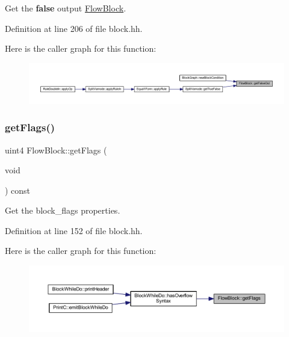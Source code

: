 Get the {\bfseries{false}} output \mbox{\hyperlink{class_flow_block}{Flow\+Block}}. 



Definition at line 206 of file block.\+hh.

Here is the caller graph for this function\+:
\nopagebreak
\begin{figure}[H]
\begin{center}
\leavevmode
\includegraphics[width=350pt]{class_flow_block_aadc5b837e1a1a2acc37f1f9cbcf04497_icgraph}
\end{center}
\end{figure}
\mbox{\label{class_flow_block_accae5b9d68d2a541494dd736765ff812}} 
\subsubsection{\texorpdfstring{getFlags()}{getFlags()}}
{\footnotesize\ttfamily uint4 Flow\+Block\+::get\+Flags (\begin{DoxyParamCaption}\item[{void}]{ }\end{DoxyParamCaption}) const\hspace{0.3cm}{\ttfamily [inline]}}



Get the block\+\_\+flags properties. 



Definition at line 152 of file block.\+hh.

Here is the caller graph for this function\+:
\nopagebreak
\begin{figure}[H]
\begin{center}
\leavevmode
\includegraphics[width=350pt]{class_flow_block_accae5b9d68d2a541494dd736765ff812_icgraph}
\end{center}
\end{figure}
\mbox{\label{class_flow_block_a7b9cd8f7c7ead109b98d92d56fab80a1}} 
